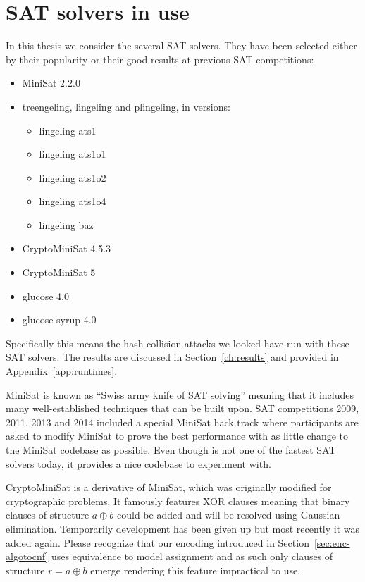 \section{SAT solvers in use}
\label{sec:sat-solvers}
%
In this thesis we consider the several SAT solvers.
They have been selected either by their popularity
or their good results at previous SAT competitions:
\begin{itemize}
  \item MiniSat 2.2.0
  \item treengeling, lingeling and plingeling, in versions:
    \begin{itemize}
      \item lingeling ats1
      \item lingeling ats1o1
      \item lingeling ats1o2
      \item lingeling ats1o4
      \item lingeling baz
    \end{itemize}
  \item CryptoMiniSat 4.5.3
  \item CryptoMiniSat 5
  \item glucose 4.0
  \item glucose syrup 4.0
\end{itemize}

Specifically this means the hash collision attacks we looked have run with
these SAT solvers. The results are discussed in Section~\ref{ch:results}
and provided in Appendix~\ref{app:runtimes}.

MiniSat is known as \enquote{Swiss army knife of SAT solving} meaning that
it includes many well-established techniques that can be built upon.
SAT competitions 2009, 2011, 2013 and 2014 included a special MiniSat
hack track where participants are asked to modify MiniSat to prove the
best performance with as little change to the MiniSat codebase as possible.
Even though is not one of the fastest SAT solvers today, it provides
a nice codebase to experiment with.

CryptoMiniSat is a derivative of MiniSat, which was originally modified
for cryptographic problems. It famously features XOR clauses meaning that
binary clauses of structure $a \oplus b$ could be added and will be resolved
using Gaussian elimination. Temporarily development has been given up
but most recently it was added again. Please recognize that our encoding
introduced in Section~\ref{sec:enc-algotocnf} uses equivalence to model
assignment and as such only clauses of structure $r = a \oplus b$ emerge
rendering this feature impractical to use.

